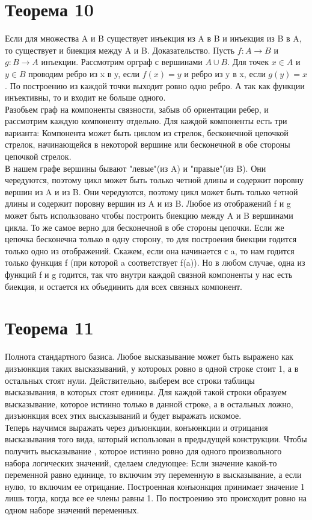 \documentclass[12pt,a4paper]{scrartcl}
\begin{document}
\section*{Теорема 10}
Если для множества A и B существует инъекция из A в B и инъекция из B в A, то
существует и биекция между A и B.
Доказательство. Пусть $f : A \rightarrow B$ и $g : B \rightarrow A$ инъекции.
Рассмотрим орграф с вершинами $A \cup B$. Для точек $x \in A$ и $y \in B$ проводим
ребро из x в y, если $f(x)=y$ и ребро из y в x, если $g(y) = x$. По построению
из каждой точки выходит ровно одно ребро. А так как функции инъективны, то и входит
не больше одного.\\
Разобьем граф на компоненты связности, забыв об ориентации ребер, и рассмотрим каждую
компоненту отдельно. Для каждой компоненты есть три варианта:
Компонента может быть циклом из стрелок, бесконечной цепочкой стрелок, начинающейся
в некоторой вершине или бесконечной в обе стороны цепочкой стрелок.\\
В нашем графе вершины бывают "левые"(из A) и "правые"(из B). Они чередуются,
поэтому цикл может быть только четной длины и содержит поровну вершин из A и из
B. Они чередуются, поэтому цикл может быть только четной длины и содержит поровну
вершин из A и из B. Любое из отображений f и g может быть использовано чтобы
построить биекцию между A и B вершинами цикла. То же самое верно для бесконечной
в обе стороны цепочки. Если же цепочка бесконечна только в одну сторону, то для
построения биекции годится только одно из отображений. Скажем, если она начинается
с a, то нам годится только функция f (при которой a соответствует f(a)).
Но в любом случае, одна из функций f и g годится, так что внутри каждой связной компоненты
у нас есть биекция, и остается их объединить для всех связных компонент.\\
\section*{Теорема 11}
Полнота стандартного базиса.
Любое высказывание может быть выражено как дизъюнкция таких высказываний, у
котороых ровно в одной строке стоит 1, а в остальных стоят нули. Действительно,
выберем все строки таблицы высказывания, в которых стоят единицы. Для каждой
такой строки образуем высказывание, которое истинно только в данной строке, а
в остальных ложно, дизъюнкция всех этих высказываний и будет выражать искомое.\\
Теперь научимся выражать через диъюнкции, конъюнкции и отрицания высказывания
того вида, который использован в предыдущей конструкции. Чтобы получить высказывание
, которое истинно ровно для одного произвольного набора логических значений, сделаем
следующее: Если значение какой-то переменной равно единице, то включим эту переменную
в высказывание, а если нулю, то включим ее отрицание. Построенная конъюнкция
принимает значение 1 лишь тогда, когда все ее члены равны 1. По построению это
происходит ровно на одном наборе значений переменных.
\end{document}
